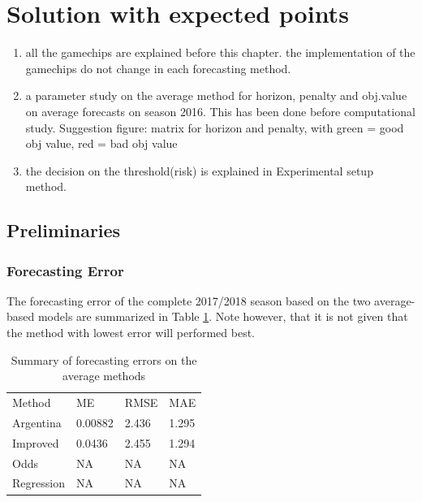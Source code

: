 \section{Solution with expected points}\label{sec:inexact}
\begin{enumerate}
    \item all the gamechips are explained before this chapter. the implementation of the gamechips do not change in each forecasting method. 
    \item a parameter study on the average method for horizon, penalty and obj.value on average forecasts on season 2016. This has been done before computational study. Suggestion figure: matrix for horizon and penalty, with green = good obj value, red = bad obj value
    \item  the decision on the threshold(risk) is explained in Experimental setup method. 
\end{enumerate}

\subsection{Preliminaries}
\subsubsection{Forecasting Error}
The forecasting error of the complete 2017/2018 season based on the two average-based models are summarized in Table \ref{tab:accuracy_average}. Note however, that it is not given that the method with lowest error will performed best. 

\begin{table}[H]
\centering
\caption{Summary of forecasting errors on the average methods}
\label{tab:accuracy_average}
\begin{tabular}{llll}
Method & ME & RMSE & MAE\\
Argentina & 0.00882 & 2.436 & 1.295 \\
Improved  & 0.0436  & 2.455 & 1.294 \\ 
Odds  & NA  & NA & NA   \\
Regression  & NA  & NA & NA \\
\end{tabular}
\end{table}

\newpage
